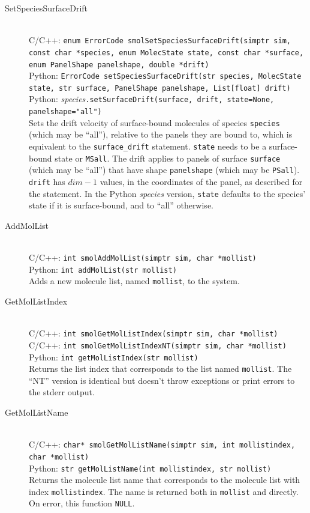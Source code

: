 \documentclass {scrbook}
\newcommand {\ttt} {\texttt}
\begin{document}
\begin{description}
\item[SetSpeciesSurfaceDrift]
\hfill \\
C/C++: \ttt{enum ErrorCode smolSetSpeciesSurfaceDrift(simptr sim, const char *species, enum MolecState state, const char *surface, enum PanelShape panelshape, double *drift)}\\
Python: \ttt{ErrorCode setSpeciesSurfaceDrift(str species, MolecState state, str surface, PanelShape panelshape, List[float] drift)}\\
Python: \textit{species}\ttt{.setSurfaceDrift(surface, drift, state=None, panelshape="all")}\\
Sets the drift velocity of surface-bound molecules of species \ttt{species} (which may be ``all''), relative to the panels they are bound to, which is equivalent to the \ttt{surface\_drift} statement. \ttt{state} needs to be a surface-bound state or \ttt{MSall}. The drift applies to panels of surface \ttt{surface} (which may be ``all'') that have shape \ttt{panelshape} (which may be \ttt{PSall}). \ttt{drift} has $dim-1$ values, in the coordinates of the panel, as described for the statement. In the Python \textit{species} version, \ttt{state} defaults to the species' state if it is surface-bound, and to ``all'' otherwise.


\item[AddMolList]
\hfill \\
C/C++: \ttt{int smolAddMolList(simptr sim, char *mollist)}\\
Python: \ttt{int addMolList(str mollist)}\\
Adds a new molecule list, named \ttt{mollist}, to the system.

\item[GetMolListIndex]
\hfill \\
C/C++: \ttt{int smolGetMolListIndex(simptr sim, char *mollist)}\\
C/C++: \ttt{int smolGetMolListIndexNT(simptr sim, char *mollist)}\\
Python: \ttt{int getMolListIndex(str mollist)}\\
Returns the list index that corresponds to the list named \ttt{mollist}. The ``NT'' version is identical but doesn't throw exceptions or print errors to the stderr output.

\item[GetMolListName]
\hfill \\
C/C++: \ttt{char* smolGetMolListName(simptr sim, int mollistindex, char *mollist)}\\
Python: \ttt{str getMolListName(int mollistindex, str mollist)}\\
Returns the molecule list name that corresponds to the molecule list with index \ttt{mollistindex}. The name is returned both in \ttt{mollist} and directly. On error, this function \ttt{NULL}.


\end{description}
\end{document}
